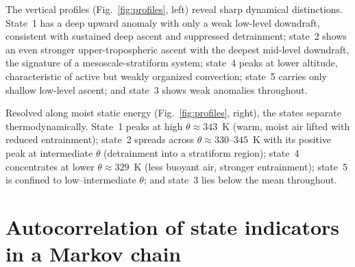 \documentclass[
    aps,
    prl,
    reprint,
    superscriptaddress,
    amsmath,amssymb,
    nofootinbib,
    floatfix
]{revtex4-2}
\begin{document}
The vertical profiles (Fig.~\ref{fig:profiles}, left) reveal sharp dynamical distinctions. State~1 has a deep upward anomaly with only a weak low-level downdraft, consistent with sustained deep ascent and suppressed detrainment; state~2 shows an even stronger upper-tropospheric ascent with the deepest mid-level downdraft, the signature of a mesoscale-stratiform system; state~4 peaks at lower altitude, characteristic of active but weakly organized convection; state~5 carries only shallow low-level ascent; and state~3 shows weak anomalies throughout.


Resolved along moist static energy (Fig.~\ref{fig:profiles}, right), the states separate thermodynamically. State~1 peaks at high $\theta\approx343$~K (warm, moist air lifted with reduced entrainment); state~2 spreads across $\theta\approx330$--$345$~K with its positive peak at intermediate $\theta$ (detrainment into a stratiform region); state~4 concentrates at lower $\theta\approx329$~K (less buoyant air, stronger entrainment); state~5 is confined to low--intermediate $\theta$; and state~3 lies below the mean throughout.



\section{Autocorrelation of state indicators in a Markov chain}
\end{document}
